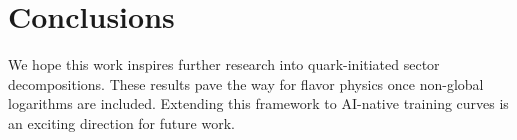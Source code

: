 \section{Conclusions}\label{sec:conclusions}

We hope this work inspires further research into quark-initiated sector
decompositions. These results pave the way for flavor physics once
non-global logarithms are included. Extending this framework to
AI-native training curves is an exciting direction for future work.

